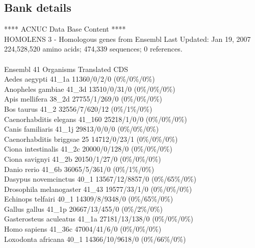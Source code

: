 \documentclass{article}
\begin{document}
\begin{Schunk}
\subsection{Bank details}
               ****     ACNUC Data Base Content      ****                      \\
      HOMOLENS 3 - Homologous genes from Ensembl Last Updated: Jan 19, 2007\\
          224,528,520 amino acids; 474,339 sequences; 0 references.\\
	 \\
                        Ensembl 41 Organisms Translated CDS\\
Aedes aegypti                           41\_1a 11360/0/2/0 (0\%/0\%/0\%)\\
Anopheles gambiae                       41\_3d 13510/0/31/0 (0\%/0\%/0\%)\\
Apis mellifera                          38\_2d 27755/1/269/0 (0\%/0\%/0\%)\\
Bos taurus                              41\_2 32556/7/620/12 (0\%/1\%/0\%)\\
Caenorhabditis elegans                  41\_160 25218/1/0/0 (0\%/0\%/0\%)\\
Canis familiaris                        41\_1j 29813/0/0/0 (0\%/0\%/0\%)\\
Caenorhabditis briggsae                 25 14712/0/23/1 (0\%/0\%/0\%)\\
Ciona intestinalis                      41\_2c 20000/0/128/0 (0\%/0\%/0\%)\\
Ciona savignyi                          41\_2b 20150/1/27/0 (0\%/0\%/0\%)\\
Danio rerio                             41\_6b 36065/5/361/0 (0\%/1\%/0\%)\\
Dasypus novemcinctus                    40\_1 13567/12/8857/0 (0\%/65\%/0\%)\\
Drosophila melanogaster                 41\_43 19577/33/1/0 (0\%/0\%/0\%)\\
Echinops telfairi                       40\_1 14309/8/9348/0 (0\%/65\%/0\%)\\
Gallus gallus                           41\_1p 20667/13/455/0 (0\%/2\%/0\%)\\
Gasterosteus aculeatus                  41\_1a 27181/13/138/0 (0\%/0\%/0\%)\\
Homo sapiens                            41\_36c 47004/41/6/0 (0\%/0\%/0\%)\\
Loxodonta africana                      40\_1 14366/10/9618/0 (0\%/66\%/0\%)\\

\end{Schunk}
\end{document}
